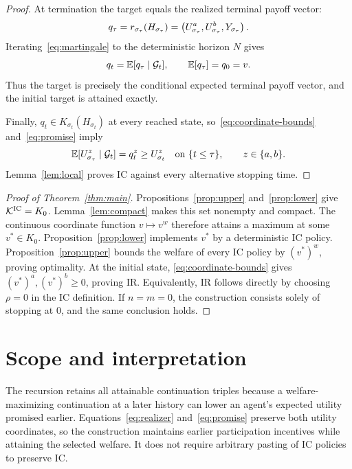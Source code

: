 \documentclass[11pt]{extarticle}
\begin{document}
\begin{proof}
At termination the target equals the realized terminal payoff vector:
\[
    q_\tau=r_{\sigma_\tau}(H_{\sigma_\tau})
       =\left(U^a_{\sigma_\tau},U^b_{\sigma_\tau},Y_{\sigma_\tau}\right).
\]
Iterating~\eqref{eq:martingale} to the deterministic horizon $N$ gives
\begin{equation}
    q_t=\mathbb{E}[q_\tau\mid\mathcal{G}_t],\qquad
    \mathbb{E}[q_\tau]=q_0=v.
    \label{eq:promise}
\end{equation}
Thus the target is precisely the conditional expected terminal payoff
vector, and the initial target is attained exactly.

Finally, $q_t\in K_{\sigma_t}(H_{\sigma_t})$ at every reached state,
so~\eqref{eq:coordinate-bounds} and~\eqref{eq:promise} imply
\[
    \mathbb{E}[U^z_{\sigma_\tau}\mid\mathcal{G}_t]
       =q_t^z\geq U^z_{\sigma_t}
       \quad\text{on }\{t\leq\tau\},\qquad z\in\{a,b\}.
\]
Lemma~\ref{lem:local} proves IC against every alternative stopping time.
\end{proof}

\begin{proof}[Proof of Theorem~\ref{thm:main}]
Propositions~\ref{prop:upper} and~\ref{prop:lower} give
$\mathcal{K}^{\mathrm{IC}}=K_0$. Lemma~\ref{lem:compact} makes this set
nonempty and compact. The continuous coordinate function $v\mapsto v^w$
therefore attains a maximum at some $v^*\in K_0$.
Proposition~\ref{prop:lower} implements $v^*$ by a deterministic IC
policy. Proposition~\ref{prop:upper} bounds the welfare of every IC
policy by $(v^*)^w$, proving optimality. At the initial state,
\eqref{eq:coordinate-bounds} gives $(v^*)^a,(v^*)^b\geq0$, proving IR.
Equivalently, IR follows directly by choosing $\rho=0$ in the IC
definition. If $n=m=0$, the construction consists solely of stopping
at $0$, and the same conclusion holds.
\end{proof}

\section{Scope and interpretation}

The recursion retains all attainable continuation triples because a
welfare-maximizing continuation at a later history can lower an agent's
expected utility promised earlier. Equations~\eqref{eq:realizer}
and~\eqref{eq:promise} preserve both utility coordinates, so the
construction maintains earlier participation incentives while attaining
the selected welfare. It does not require arbitrary pasting of IC
policies to preserve IC.
\end{document}
